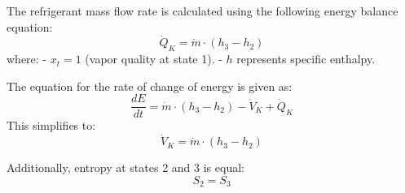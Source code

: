 The refrigerant mass flow rate is calculated using the following energy balance equation:  
\[
\dot{Q}_K = \dot{m} \cdot (h_3 - h_2)
\]  
where:  
- \(x_t = 1\) (vapor quality at state 1).  
- \(h\) represents specific enthalpy.  

The equation for the rate of change of energy is given as:  
\[
\frac{dE}{dt} = \dot{m} \cdot (h_3 - h_2) - \dot{V}_K + \dot{Q}_K
\]  
This simplifies to:  
\[
\dot{V}_K = \dot{m} \cdot (h_3 - h_2)
\]  

Additionally, entropy at states 2 and 3 is equal:  
\[
S_2 = S_3
\]
